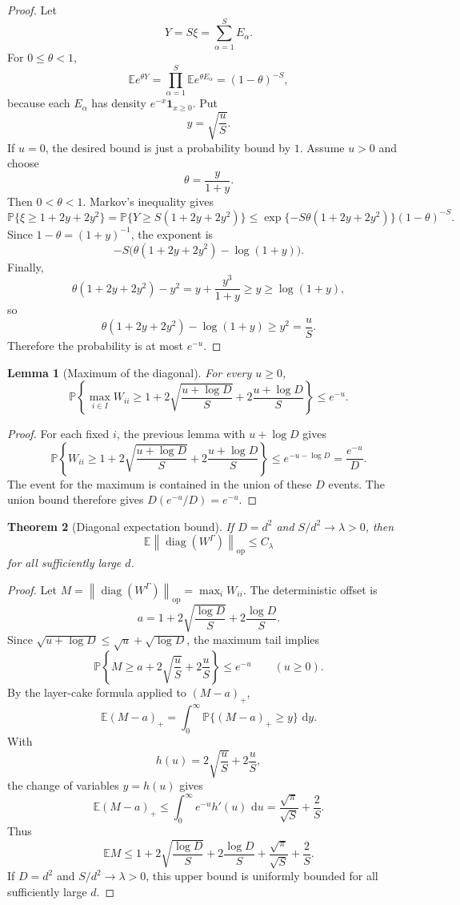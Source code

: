 \documentclass[11pt,oneside]{book}
\newtheorem{theorem}{Theorem}[chapter]
\newtheorem{lemma}[theorem]{Lemma}
\DeclareMathOperator{\diag}{diag}
\newcommand{\E}{\mathbb E}
\newcommand{\Prob}{\mathbb P}
\newcommand{\1}{\mathbf 1}
\newcommand{\GammaPT}{\Gamma}
\newcommand{\op}{\mathrm{op}}
\newcommand{\dd}{\,\mathrm d}
\newcommand{\norm}[1]{\left\|#1\right\|}
\begin{document}
\begin{proof}
Let
\[
  Y=S\xi=\sum_{\alpha=1}^S E_\alpha .
\]
For \(0\le\theta<1\),
\[
  \E e^{\theta Y}
  =
  \prod_{\alpha=1}^S \E e^{\theta E_\alpha}
  =
  (1-\theta)^{-S},
\]
because each \(E_\alpha\) has density \(e^{-x}\mathbf 1_{x\ge0}\).  Put
\[
  y=\sqrt{\frac uS}.
\]
If \(u=0\), the desired bound is just a probability bound by \(1\).  Assume
\(u>0\) and choose
\[
  \theta=\frac{y}{1+y}.
\]
Then \(0<\theta<1\).  Markov's inequality gives
\[
  \Prob\{\xi\ge 1+2y+2y^2\}
  =
  \Prob\{Y\ge S(1+2y+2y^2)\}
  \le
  \exp\{-S\theta(1+2y+2y^2)\}(1-\theta)^{-S}.
\]
Since \(1-\theta=(1+y)^{-1}\), the exponent is
\[
  -S\bigl(\theta(1+2y+2y^2)-\log(1+y)\bigr).
\]
Finally,
\[
  \theta(1+2y+2y^2)-y^2
  =
  y+\frac{y^3}{1+y}
  \ge y
  \ge \log(1+y),
\]
so
\[
  \theta(1+2y+2y^2)-\log(1+y)\ge y^2=\frac uS.
\]
Therefore the probability is at most \(e^{-u}\).
\end{proof}

\begin{lemma}[Maximum of the diagonal]
For every \(u\ge0\),
\[
  \Prob\left\{
    \max_{i\in I}W_{ii}
    \ge
    1+2\sqrt{\frac{u+\log D}{S}}
      +2\frac{u+\log D}{S}
  \right\}
  \le e^{-u}.
\]
\end{lemma}

\begin{proof}
For each fixed \(i\), the previous lemma with \(u+\log D\) gives
\[
  \Prob\left\{
    W_{ii}\ge
    1+2\sqrt{\frac{u+\log D}{S}}
      +2\frac{u+\log D}{S}
  \right\}
  \le e^{-u-\log D}=\frac{e^{-u}}{D}.
\]
The event for the maximum is contained in the union of these \(D\) events.
The union bound therefore gives \(D(e^{-u}/D)=e^{-u}\).
\end{proof}

\begin{theorem}[Diagonal expectation bound]
If \(D=d^2\) and \(S/d^2\to\lambda>0\), then
\[
  \E\norm{\diag(W^{\GammaPT})}_{\op}\le C_\lambda
\]
for all sufficiently large \(d\).
\end{theorem}

\begin{proof}
Let \(M=\norm{\diag(W^{\GammaPT})}_{\op}=\max_i W_{ii}\).  The deterministic
offset is
\[
  a=1+2\sqrt{\frac{\log D}{S}}+2\frac{\log D}{S}.
\]
Since \(\sqrt{u+\log D}\le\sqrt u+\sqrt{\log D}\), the maximum tail implies
\[
  \Prob\left\{
    M\ge a+2\sqrt{\frac uS}+2\frac uS
  \right\}\le e^{-u}
  \qquad (u\ge0).
\]
By the layer-cake formula applied to \((M-a)_+\),
\[
  \E(M-a)_+
  =
  \int_0^\infty \Prob\{(M-a)_+\ge y\}\,\dd y .
\]
With
\[
  h(u)=2\sqrt{\frac uS}+2\frac uS,
\]
the change of variables \(y=h(u)\) gives
\[
  \E(M-a)_+
  \le
  \int_0^\infty e^{-u}h'(u)\,\dd u
  =
  \frac{\sqrt\pi}{\sqrt S}+\frac2S.
\]
Thus
\[
  \E M
  \le
  1+2\sqrt{\frac{\log D}{S}}+2\frac{\log D}{S}
  +\frac{\sqrt\pi}{\sqrt S}+\frac2S.
\]
If \(D=d^2\) and \(S/d^2\to\lambda>0\), this upper bound is uniformly bounded
for all sufficiently large \(d\).
\end{proof}
\end{document}
